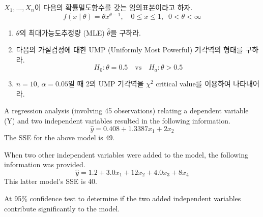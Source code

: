 \documentclass[answers]{exam}
\begin{document}
\begin{questions}
\begin{solution}
   \end{solution}
   \question
   $X_{1},\ldots,X_{n}$이 다음의 확률밀도함수를 갖는 임의표본이라고 하자.
   $$
    f\left(x\;|\;\theta\right)=\theta x^{\theta-1},\quad 0\leq x\leq 1, \;\; 0<\theta<\infty
   $$
   \begin{enumerate}
    \item $\theta$의 최대가능도추정량 (MLE) $\hat{\theta}$을 구하라.
    \item 다음의 가설검정에 대한 UMP (Uniformly Most Powerful) 기각역의 형태를 구하라.
    $$
      H_{0}: \theta=0.5\quad \text{vs} \quad H_{a}:\theta>0.5
    $$
    \item $n=10$, $\alpha=0.05$일 때 2의 UMP 기각역을 $\chi^{2}$ critical value를 이용하여 나타내어라.
   \end{enumerate}
   \begin{solution}

   \end{solution}
   \question
   A regression analysis (involving 45 observations) relating a dependent variable (Y) and two independent variables resulted in the following information.
   $$
    \hat{y} = 0.408+1.3387x_{1}+2x_{2}
   $$
   The SSE for the above model is 49.\par
   When two other independent variables were added to the model, the following information was provided.
   $$
    \hat{y} = 1.2+3.0x_{1}+12x_{2}+4.0x_{3}+8x_{4}
   $$
   This latter model's SSE is 40.\par
   At 95\% confidence test to determine if the two added independent variables contribute significantly to the model. 
   \begin{solution}

   \end{solution}
\end{questions}
\end{document}
